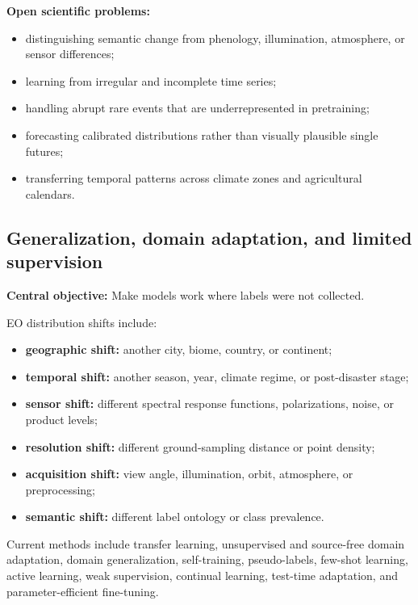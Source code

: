 \documentclass[
  a4paper,
  11pt]{article}
\providecommand{\tightlist}{%
  \setlength{\itemsep}{0pt}\setlength{\parskip}{0pt}}
\begin{document}
\textbf{Open scientific problems:}

\begin{itemize}
\tightlist
\item
  distinguishing semantic change from phenology, illumination,
  atmosphere, or sensor differences;
\item
  learning from irregular and incomplete time series;
\item
  handling abrupt rare events that are underrepresented in pretraining;
\item
  forecasting calibrated distributions rather than visually plausible
  single futures;
\item
  transferring temporal patterns across climate zones and agricultural
  calendars.
\end{itemize}

\hypertarget{generalization-domain-adaptation-and-limited-supervision}{%
\subsection{Generalization, domain adaptation, and limited
supervision}\label{generalization-domain-adaptation-and-limited-supervision}}

\textbf{Central objective:} Make models work where labels were not
collected.

EO distribution shifts include:

\begin{itemize}
\tightlist
\item
  \textbf{geographic shift:} another city, biome, country, or continent;
\item
  \textbf{temporal shift:} another season, year, climate regime, or
  post-disaster stage;
\item
  \textbf{sensor shift:} different spectral response functions,
  polarizations, noise, or product levels;
\item
  \textbf{resolution shift:} different ground-sampling distance or point
  density;
\item
  \textbf{acquisition shift:} view angle, illumination, orbit,
  atmosphere, or preprocessing;
\item
  \textbf{semantic shift:} different label ontology or class prevalence.
\end{itemize}

Current methods include transfer learning, unsupervised and source-free
domain adaptation, domain generalization, self-training, pseudo-labels,
few-shot learning, active learning, weak supervision, continual
learning, test-time adaptation, and parameter-efficient fine-tuning.
\end{document}
